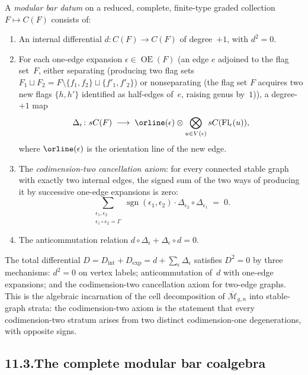 \documentclass[11pt]{report}
\theoremstyle{definition}
\theoremstyle{remark}
\providecommand{\cM}{\mathcal{M}}
\numberwithin{equation}{section}
\begin{document}
A \emph{modular bar datum} on a reduced, complete, finite-type
graded collection $F\mapsto C(F)$ consists of:
\begin{enumerate}[label=(\roman*)]
\item An internal differential $d\colon C(F)\to C(F)$ of
 degree~$+1$, with $d^2=0$.
\item For each one-edge expansion
 $\epsilon\in\operatorname{OE}(F)$ (an edge $e$ adjoined to the
 flag set~$F$, either separating (producing two flag sets
 $F_1\sqcup F_2=F\setminus\{f_1,f_2\}\sqcup\{f'_1,f'_2\}$)
 or nonseparating (the flag set $F$ acquires two new flags
 $\{h,h'\}$ identified as half-edges of~$e$, raising genus
 by~$1$)), a degree-$+1$ map
 \[
 \Delta_\epsilon\colon sC(F)
 \;\longrightarrow\;
 \orline(\epsilon)\otimes
 \bigotimes_{u\in V(\epsilon)}sC(\operatorname{Fl}_\epsilon(u)),
 \]
 where $\orline(\epsilon)$ is the orientation line of the
 new edge.
\item The \emph{codimension-two cancellation axiom}: for every
 connected stable graph with exactly two internal edges, the
 signed sum of the two ways of producing it by successive
 one-edge expansions is zero:
 \[
 \sum_{\substack{\epsilon_1,\epsilon_2\\
 \epsilon_1\circ\epsilon_2=\Gamma}}
 \operatorname{sgn}(\epsilon_1,\epsilon_2)\cdot
 \Delta_{\epsilon_2}\circ\Delta_{\epsilon_1}
 \;=\;0.
 \]
\item The anticommutation relation
 $d\circ\Delta_\epsilon+\Delta_\epsilon\circ d=0$.
\end{enumerate}
The total differential
$D=D_{\mathrm{int}}+D_{\mathrm{exp}}
=d+\sum_\epsilon\Delta_\epsilon$ satisfies $D^2=0$ by three
mechanisms: $d^2=0$ on vertex labels; anticommutation of~$d$
with one-edge expansions; and the codimension-two cancellation
axiom for two-edge graphs. This is the algebraic incarnation
of the cell decomposition of $\overline{\cM}_{g,n}$ into
stable-graph strata: the codimension-two axiom is the statement
that every codimension-two stratum arises from two distinct
codimension-one degenerations, with opposite signs.

\subsection*{11.3.\enspace The complete modular bar coalgebra}
\end{document}
